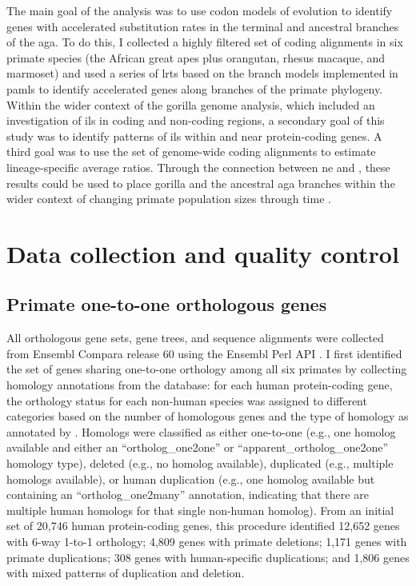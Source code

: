 The main goal of the analysis was to use codon models of evolution to
identify genes with accelerated \nsyn substitution rates in the
terminal and ancestral branches of the \ac{aga}. To do this, I
collected a highly filtered set of coding alignments in six primate
species (the African great apes plus orangutan, rhesus macaque, and
marmoset) and used a series of \acp{lrt} based on the branch models
implemented in \acp{paml} to identify accelerated genes along branches
of the primate phylogeny. Within the wider context of the gorilla
genome analysis, which included an investigation of \ac{ils} in coding
and non-coding regions, a secondary goal of this study was to identify
patterns of \ac{ils} within and near protein-coding genes. A third
goal was to use the set of genome-wide coding alignments to estimate
lineage-specific average \dnds ratios. Through the connection between
\ac{ne} and \dnds, these results could be used to place gorilla and
the ancestral \ac{aga} branches within the wider context of changing primate population sizes through time \citep{Sequencing2005a}.

\section{Data collection and quality control}
\subsection{Primate one-to-one orthologous genes}

All orthologous gene sets, gene trees, and sequence alignments were
collected from Ensembl Compara release 60 using the Ensembl Perl API
\citep{Vilella2009,Flicek2011}. I first identified the set of genes
sharing one-to-one orthology among all six primates by collecting
homology annotations from the \ens \cmp database: for each human
protein-coding gene, the orthology status for each non-human species
was assigned to different categories based on the number of homologous
genes and the type of homology as annotated by \ens. Homologs were
classified as either one-to-one (e.g., one homolog available and
either an ``ortholog\_one2one'' or ``apparent\_ortholog\_one2one''
homology type), deleted (e.g., no homolog available), duplicated
(e.g., multiple homologs available), or human duplication (e.g., one
homolog available but containing an ``ortholog\_one2many'' annotation,
indicating that there are multiple human homologs for that single
non-human homolog). From an initial set of 20,746 human protein-coding
genes, this procedure identified 12,652 genes with 6-way 1-to-1
orthology; 4,809 genes with primate deletions; 1,171 genes with
primate duplications; 308 genes with human-specific duplications; and
1,806 genes with mixed patterns of duplication and deletion.

